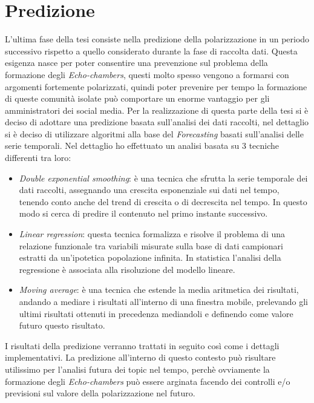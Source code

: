 \section{Predizione}
L'ultima fase della tesi consiste nella predizione della polarizzazione in un periodo successivo rispetto a quello considerato durante la fase di raccolta dati. Questa esigenza nasce per poter consentire una prevenzione sul problema della formazione degli \textit{Echo-chambers}, questi molto spesso vengono a formarsi con argomenti fortemente polarizzati, quindi poter prevenire per tempo la formazione di queste comunità isolate può comportare un enorme vantaggio per gli amministratori dei social media. Per la realizzazione di questa parte della tesi si è deciso di adottare una predizione basata sull'analisi dei dati raccolti, nel dettaglio si è deciso di utilizzare algoritmi alla base del \textit{Forecasting} basati sull'analisi delle serie temporali.
Nel dettaglio ho effettuato un analisi basata su 3 tecniche differenti tra loro:
\begin{itemize}
\item \textit{Double exponential smoothing}: è una tecnica che sfrutta la serie temporale dei dati raccolti, assegnando una crescita esponenziale sui dati nel tempo, tenendo conto anche del trend di crescita o di decrescita nel tempo. In questo modo si cerca di predire il contenuto nel primo instante successivo.
\item \textit{Linear regression}: questa tecnica formalizza e risolve il problema di una relazione funzionale tra variabili misurate sulla base di dati campionari estratti da un'ipotetica popolazione infinita. In statistica l'analisi della regressione è associata alla risoluzione del modello lineare. 
\item \textit{Moving average}: è una tecnica che estende la media aritmetica dei risultati, andando a mediare i risultati all'interno di una finestra mobile, prelevando gli ultimi risultati ottenuti in precedenza mediandoli e definendo come valore futuro questo risultato. 
\end{itemize}
I risultati della predizione verranno trattati in seguito così come i dettagli implementativi. La predizione all'interno di questo contesto può risultare utilissimo per l'analisi futura dei topic nel tempo, perchè ovviamente la formazione degli \textit{Echo-chambers} può essere arginata facendo dei controlli e/o previsioni sul valore della polarizzazione nel futuro.
